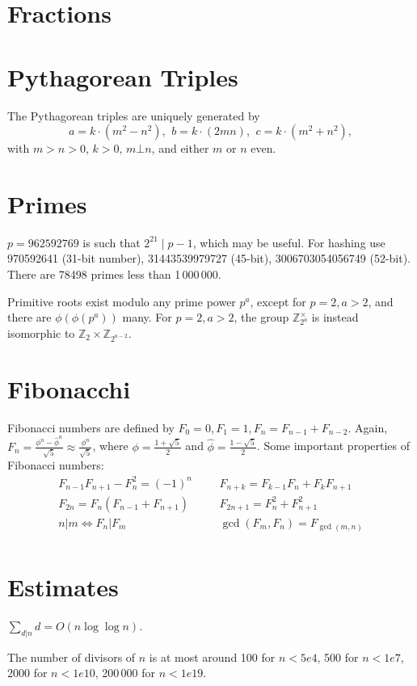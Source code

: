 \section{Fractions}

\section{Pythagorean Triples}
 The Pythagorean triples are uniquely generated by
 \[ a=k\cdot (m^{2}-n^{2}),\ \,b=k\cdot (2mn),\ \,c=k\cdot (m^{2}+n^{2}), \]
 with $m > n > 0$, $k > 0$, $m \bot n$, and either $m$ or $n$ even.

\section{Primes}
	$p=962592769$ is such that $2^{21} \mid p-1$, which may be useful. For hashing
	use 970592641 (31-bit number), 31443539979727 (45-bit), 3006703054056749
	(52-bit). There are 78498 primes less than 1\,000\,000.

	Primitive roots exist modulo any prime power $p^a$, except for $p = 2, a > 2$, and there are $\phi(\phi(p^a))$ many.
	For $p = 2, a > 2$, the group $\mathbb Z_{2^a}^\times$ is instead isomorphic to $\mathbb Z_2 \times \mathbb Z_{2^{a-2}}$.
\section{Fibonacchi}
Fibonacci numbers are defined by $F_0 = 0, F_1 = 1, F_n = F_{n-1} + F_{n-2}$. Again, $F_n = \frac{\phi^n - \hat{\phi}^n}{\sqrt{5}} \approx \frac{\phi^n}{\sqrt{5}} $, where $\phi = \frac{1 + \sqrt{5}}{2}$ and $\hat{\phi} = \frac{1 - \sqrt{5}}{2}$.
Some important properties of Fibonacci numbers:
\begin{align*}
  F_{n-1}F_{n+1} - F_n^2 = (-1)^n &&& F_{n+k} = F_{k-1}F_{n} + F_kF_{n+1} \\
  F_{2n} = F_n(F_{n-1} + F_{n+1}) &&& F_{2n+1} = F_n^2 + F_{n+1}^2 \\
  n | m \Leftrightarrow F_n | F_m &&& \gcd(F_m, F_n) = F_{\gcd(m,n)} \\
\end{align*}
\section{Estimates}
	$\sum_{d|n} d = O(n \log \log n)$.

	The number of divisors of $n$ is at most around 100 for $n < 5e4$, 500 for $n < 1e7$, 2000 for $n < 1e10$, 200\,000 for $n < 1e19$.

